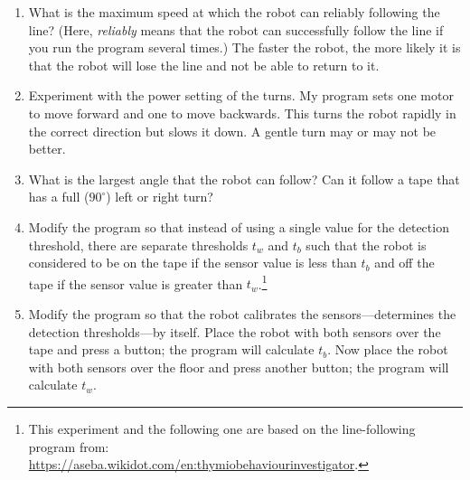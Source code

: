 
\begin{enumerate}

\item What is the maximum speed at which the robot can reliably
following the line? (Here, \emph{reliably} means that the robot can
successfully follow the line if you run the program several times.) The
faster the robot, the more likely it is that the robot will lose the
line and not be able to return to it.

\item Experiment with the power setting of the turns. My program sets
one motor to move forward and one to move backwards. This turns the
robot rapidly in the correct direction but slows it down. A gentle turn
may or may not be better.

\item What is the largest angle that the robot can follow? Can it follow
a tape that has a full ($90^\circ$) left or right turn?

\item Modify the program so that instead of using a single value for the
detection threshold, there are separate thresholds $t_w$ and $t_b$ such
that the robot is considered to be on the tape if the sensor value is
less than $t_b$ and off the tape if the sensor value is greater than
$t_w$.\footnote{This experiment and the following one are based on the
 line-following program from:\\
\url{https://aseba.wikidot.com/en:thymiobehaviourinvestigator}.}

\item Modify the program so that the robot calibrates the
sensors---determines the detection thresholds---by itself. Place the
robot with both sensors over the tape and press a button; the program
will calculate $t_b$. Now place the robot with both sensors over the
floor and press another button; the program will calculate $t_w$.

\end{enumerate}